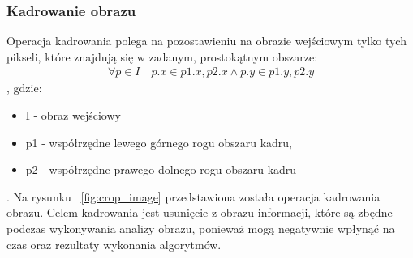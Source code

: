 \subsubsection{Kadrowanie obrazu}
Operacja kadrowania polega na pozostawieniu na obrazie wejściowym tylko tych pikseli, które znajdują się w zadanym, prostokątnym obszarze:
\begin{gather*}
  \forall p \in I\quad p.x \in {p1.x, p2.x} \wedge p.y \in {p1.y, p2.y}
\end{gather*}, gdzie:
\begin{itemize}
  \item I - obraz wejściowy
  \item p1 - współrzędne lewego górnego rogu obszaru kadru,
  \item p2 - współrzędne prawego dolnego rogu obszaru kadru
\end{itemize}. Na rysunku ~\ref{fig:crop_image} przedstawiona została operacja kadrowania obrazu. Celem kadrowania jest usunięcie z obrazu informacji, które są zbędne podczas wykonywania analizy obrazu, ponieważ mogą negatywnie wpłynąć na czas oraz rezultaty wykonania algorytmów.
